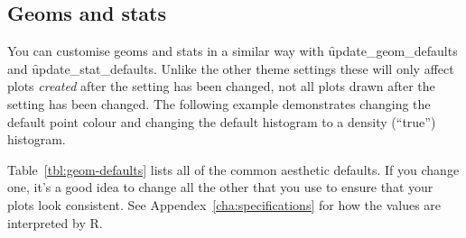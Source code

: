 % 


\subsection{Geoms and stats}
\label{sub:geoms_and_stats}

You can customise geoms and stats in a similar way with \f{update_geom_defaults} and \f{update_stat_defaults}.  Unlike the other theme settings these will only affect plots \emph{created} after the setting has been changed, not all plots drawn after the setting has been changed.  The following example demonstrates changing the default point colour and changing the default histogram to a density (``true'') histogram.  

Table~\ref{tbl:geom-defaults} lists all of the common aesthetic defaults.  If you change one, it's a good idea to change all the other that you use to ensure that your plots look consistent.  See Appendex~\ref{cha:specifications} for how the values are interpreted by R.

% 

